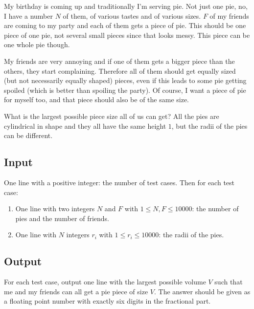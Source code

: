 My birthday is coming up and traditionally I'm serving pie. Not just one pie,
   no, I have a number $N$ of them, of various tastes and of various sizes.
   $F$ of
   my friends are coming to my party and each of them gets a piece of pie. This
   should be one piece of one pie, not several small pieces since that looks
   messy. This piece can be one whole pie though.

   My friends are very annoying and if one of them gets a bigger piece than the
   others, they start complaining. Therefore all of them should get equally
   sized (but not necessarily equally shaped) pieces, even if this leads to
   some pie getting spoiled (which is better than spoiling the party). Of
   course, I want a piece of pie for myself too, and that piece should also be
   of the same size.

   What is the largest possible piece size all of us can get? All the pies are
   cylindrical in shape and they all have the same height $1$, but the radii of
   the pies can be different. 

\subsection*{Input}

One line with a positive integer: the number of test cases. Then for each test
case: 

\begin{enumerate}
    \item One line with two integers $N$ and $F$ with
    $1 \leq N, F \leq 10000$: the number of pies and the number of friends. 

    \item One line with $N$ integers $r_i$ with $1 \leq r_i \leq 10000$: the
    radii of the pies. 
\end{enumerate}

\subsection*{Output}

For each test case, output one line with the largest possible volume $V$ such
that me and my friends can all get a pie piece of size $V$. The answer should
be given as a floating point number with exactly six digits in the fractional
part.

